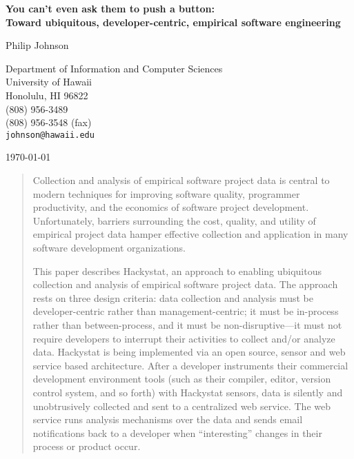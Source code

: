 \begin{titlepage}
\vspace*{1in}
\begin{center}
   
\Large
{\bf  You can't even ask them to push a button: \\
Toward ubiquitous, developer-centric, empirical software engineering}

\bigskip

\normalsize

Philip Johnson                           \medskip\par
Department of Information and Computer Sciences\\ 
University of Hawaii\\ 
Honolulu, HI 96822\\                       
(808) 956-3489\\
(808) 956-3548 (fax)\\
{\tt johnson@hawaii.edu}                 \bigskip\par

\today                                   \bigskip\par

\begin{abstract}

Collection and analysis of empirical software project data is central to
modern techniques for improving software quality, programmer productivity,
and the economics of software project development. Unfortunately, barriers
surrounding the cost, quality, and utility of empirical project data
hamper effective collection and application in many software 
development organizations.

This paper describes Hackystat, an approach to enabling ubiquitous
collection and analysis of empirical software project data. The approach
rests on three design criteria: data collection and analysis must be
developer-centric rather than management-centric; it must be in-process
rather than between-process, and it must be non-disruptive---it must not
require developers to interrupt their activities to collect and/or analyze
data.  Hackystat is being implemented via an open source, sensor and web
service based architecture.  After a developer instruments their commercial
development environment tools (such as their compiler, editor, version
control system, and so forth) with Hackystat sensors, data is silently and
unobtrusively collected and sent to a centralized web service.  The web
service runs analysis mechanisms over the data and sends email
notifications back to a developer when ``interesting'' changes in their
process or product occur.


\end{abstract}
\end{center}
\end{titlepage}
